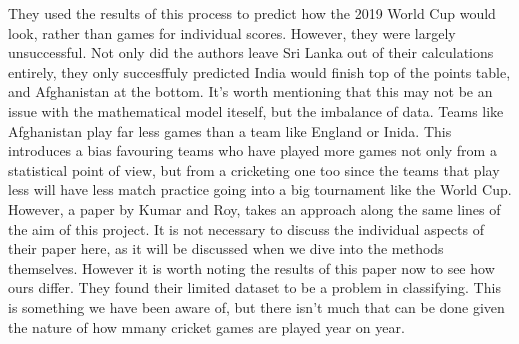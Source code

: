They used the results of this process to predict how the 2019 World Cup would look, rather than games for individual scores. However, they were largely unsuccessful. 
Not only did the authors leave Sri Lanka out of their calculations entirely, they only succesffuly predicted India would finish top of the points table, and Afghanistan 
at the bottom. It's worth mentioning that this may not be an issue with the mathematical model iteself, but the imbalance of data. Teams like Afghanistan play far less games 
than a team like England or Inida. This introduces a bias favouring teams who have played more games not only from a statistical point of view, but from a cricketing one too 
since the teams that play less will have less match practice going into a big tournament like the World Cup. \\

However, a paper by Kumar and Roy, \cite{kumar} takes an approach along the same lines of the aim of this project. It is not necessary to discuss the individual aspects
of their paper here, as it will be discussed when we dive into the methods themselves. However it is worth noting the results of this paper now to see how
ours differ. They found their limited dataset to be a problem in classifying. This is something we have been aware of, but there isn't much that can be done
given the nature of how mmany cricket games are played year on year. 